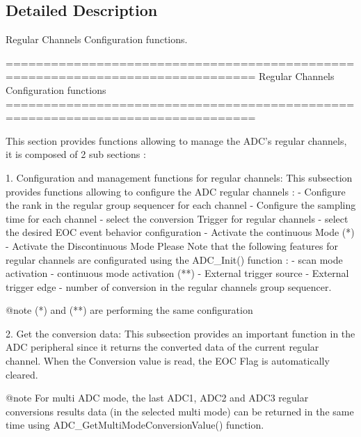 \subsection{Detailed Description}
Regular Channels Configuration functions. \begin{DoxyVerb} ===============================================================================
                  Regular Channels Configuration functions
 ===============================================================================  

  This section provides functions allowing to manage the ADC's regular channels,
  it is composed of 2 sub sections : 
  
  1. Configuration and management functions for regular channels: This subsection 
     provides functions allowing to configure the ADC regular channels :    
          - Configure the rank in the regular group sequencer for each channel
          - Configure the sampling time for each channel
          - select the conversion Trigger for regular channels
          - select the desired EOC event behavior configuration
          - Activate the continuous Mode  (*)
          - Activate the Discontinuous Mode 
     Please Note that the following features for regular channels are configurated
     using the ADC_Init() function : 
          - scan mode activation 
          - continuous mode activation (**) 
          - External trigger source  
          - External trigger edge 
          - number of conversion in the regular channels group sequencer.
     
     @note (*) and (**) are performing the same configuration
     
  2. Get the conversion data: This subsection provides an important function in 
     the ADC peripheral since it returns the converted data of the current 
     regular channel. When the Conversion value is read, the EOC Flag is 
     automatically cleared.
     
     @note For multi ADC mode, the last ADC1, ADC2 and ADC3 regular conversions 
           results data (in the selected multi mode) can be returned in the same 
           time using ADC_GetMultiModeConversionValue() function. \end{DoxyVerb}
 

